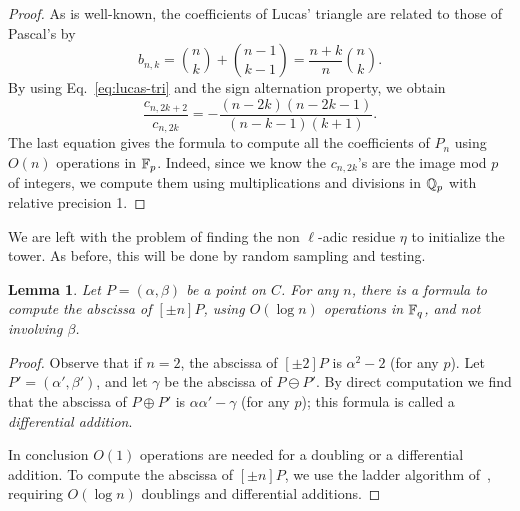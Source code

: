 \documentclass{sig-alternate}
\newtheorem{lemma}[definition]{Lemma}
\begin{document}
\begin{proof}
  As is well-known, the coefficients of
  Lucas' triangle are related to those of Pascal's by
  \begin{equation}
    \label{eq:lucas-tri}
    b_{n,k} = \binom{n}{k} + \binom{n-1}{k-1} = \frac{n+k}{n}\binom{n}{k}.
  \end{equation}
  By using Eq.~\eqref{eq:lucas-tri} and the sign alternation property,
  we obtain 
  \begin{equation*}
    \frac{c_{n,2k+2}}{c_{n,2k}} = 
    -\frac{(n-2k)(n-2k-1)}{(n-k-1)(k+1)}.
  \end{equation*}
  The last equation gives the formula to compute all the coefficients
  of $P_n$ using $O(n)$ operations in $\mathbb{F}_p$. Indeed, since we know
  the $c_{n,2k}$'s are the image mod $p$ of integers, we compute them
  using multiplications and divisions in $\mathbb{Q}_p$ with relative
  precision 1.
\end{proof}

We are left with the problem of finding the non $\ell$-adic residue
$\eta$ to initialize the tower. As before, this will be done by random
sampling and testing.

\begin{lemma}
  \label{th:montgomery}
  Let $P=(\alpha,\beta)$ be a point on $C$. For any $n$, there is a
  formula to compute the abscissa of $[\pm n]P$, using $O(\log n)$
  operations in $\mathbb{F}_q$, and not involving $\beta$.
\end{lemma}
\begin{proof}
  Observe that if $n=2$, the abscissa of $[\pm 2]P$ is $\alpha^2-2$
  (for any $p$).  Let $P'=(\alpha',\beta')$, and let $\gamma$ be the
  abscissa of $P\ominus P'$. By direct computation we find that the
  abscissa of $P\oplus P'$ is $\alpha\alpha'-\gamma$ (for any $p$);
  this formula is called a \emph{differential addition}.

  In conclusion $O(1)$ operations are needed for a doubling or a
  differential addition. To compute the abscissa of $[\pm n]P$, we use
  the ladder algorithm of~\cite{montgomery}, requiring $O(\log n)$
  doublings and differential additions.
\end{proof}
\end{document}
